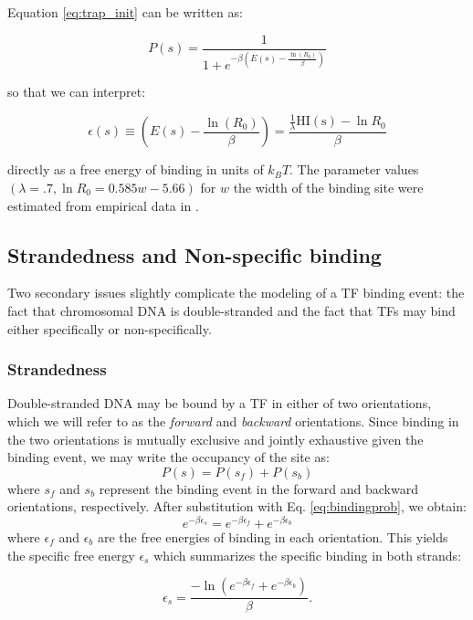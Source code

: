 \documentclass{article}
\begin{document}
Equation \ref{eq:trap_init} can be written as:

\begin{equation}
\label{eq:bindingprob}
  P(s) = \frac{1}{1+e^{-\beta(E(s) - \frac{\ln(R_0)}{\beta})}}
\end{equation}

so that we can interpret:

\begin{equation}
  \label{eq:bindingenergy}
  \epsilon(s) \equiv (E(s) - \frac{\ln(R_0)}{\beta}) = \frac{\frac{1}{\lambda}\mathrm{HI(s)} - \ln R_0}{\beta}
\end{equation}

directly as a free energy of binding in units of $k_BT$.  The parameter values $(\lambda = .7, \ln R_0 = 0.585 w - 5.66)$ for $w$ the width of the binding site were estimated from empirical data in \cite{manke08}.

\subsection{Strandedness and Non-specific binding}

Two secondary issues slightly complicate the modeling of a TF binding
event: the fact that chromosomal DNA is double-stranded and the fact
that TFs may bind either specifically or non-specifically.

\subsubsection{Strandedness}
Double-stranded DNA may be bound by a TF in either of two
orientations, which we will refer to as the \textit{forward} and
\textit{backward} orientations.  Since binding in the two orientations
is mutually exclusive and jointly exhaustive given the binding event,
we may write the occupancy of the site as:
\begin{equation}
P(s) = P(s_f) + P(s_b)
\end{equation}
where $s_f$ and $s_b$ represent the binding event in the forward and backward orientations, respectively.  After substitution with Eq. \ref{eq:bindingprob}, we obtain:
$$e^{-\beta \epsilon_s} = e^{-\beta \epsilon_f} + e^{-\beta \epsilon_b}$$
where $\epsilon_f$ and $\epsilon_b$ are the free energies of binding in
each orientation.  This yields the specific free energy
$\epsilon_s$ which summarizes the specific binding in both strands:

\begin{equation}
\label{eq:doublestrandedbinding}
\epsilon_s = \frac{-\ln(e^{-\beta \epsilon_f} + e^{-\beta \epsilon_b})}{\beta}.
\end{equation}
\end{document}
